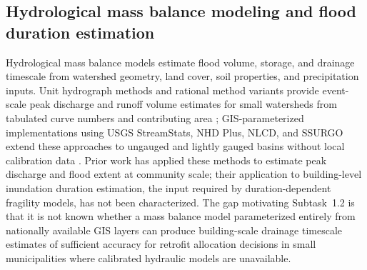 \documentclass[11pt]{article}
\begin{document}
\subsection{Hydrological mass balance modeling and flood duration estimation}
Hydrological mass balance models estimate flood volume, storage, and drainage
timescale from watershed geometry, land cover, soil properties, and precipitation
inputs.
Unit hydrograph methods and rational method variants provide event-scale peak
discharge and runoff volume estimates for small watersheds from tabulated curve
numbers and contributing area \cite{usdascs1986tr55}; GIS-parameterized implementations using USGS
StreamStats, NHD Plus, NLCD, and SSURGO extend these approaches to ungauged
and lightly gauged basins without local calibration data
\cite{ries2017streamstats,moore2019nhdplus}.
Prior work has applied these methods to estimate peak discharge and flood extent
at community scale; their application to building-level inundation duration
estimation, the input required by duration-dependent fragility models, has not
been characterized.
The gap motivating Subtask~1.2 is that it is not known whether a mass balance
model parameterized entirely from nationally available GIS layers can produce
building-scale drainage timescale estimates of sufficient accuracy for retrofit
allocation decisions in small municipalities where calibrated hydraulic models
are unavailable.
\end{document}
